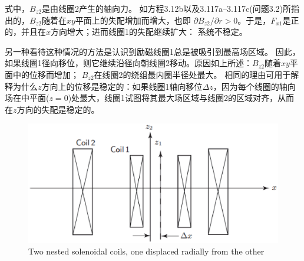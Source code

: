 式中，$B_{z2}$是由线圈2产生的轴向力。
如方程3.12b以及3.117a–3.117c(问题3.2)所指出的，$B_{z2}$随着在$xy$平面上的失配增加而增大，也即
$\partial B_{z2}/\partial r>0$。于是，$F_{x1}$是正的，并且在$x$方向增大；进而线圈1的失配继续扩大：
系统不稳定。

另一种看待这种情况的方法是认识到励磁线圈1总是被吸引到最高场区域。
因此，如果线圈1径向移位，则它继续沿径向朝线圈2移动。原因如上所述：$B_{z2}$随着$xy$平面中的位移而增加； $B_{z2}$在线圈2的绕组最内圈半径处最大。
相同的理由可用于解释为什么$z$方向上的位移是稳定的：如果线圈1轴向移位$\Delta z$，因为每个线圈的轴向场在中平面($z = 0$)处最大，线圈1试图将其最大场区域与线圈2的区域对齐，从而在$z$方向的失配是稳定的。
\begin{figure}[htbp]
	\centering
	\includegraphics[scale=0.5]{chpt3/figs/fig3.47.eps}
	\caption{Two nested solenoidal coils, one displaced radially from the other}
\end{figure}


